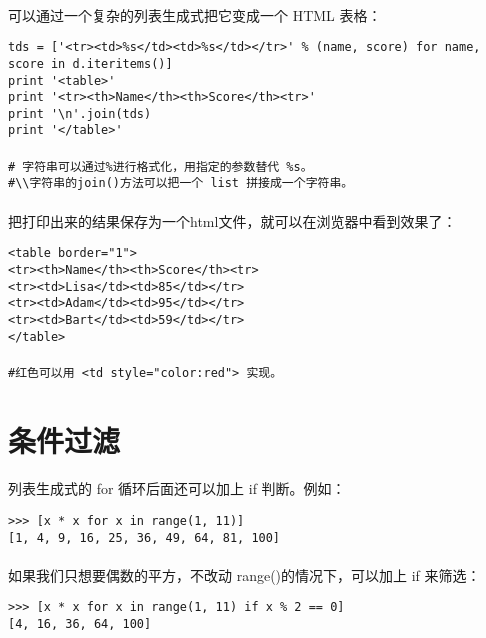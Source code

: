 \documentclass{article}
\begin{document}
\begin{CJK}{UTF8}{gbsn}
\paragraph{}
可以通过一个复杂的列表生成式把它变成一个 HTML 表格：
\begin{verbatim}
tds = ['<tr><td>%s</td><td>%s</td></tr>' % (name, score) for name, score in d.iteritems()]
print '<table>'
print '<tr><th>Name</th><th>Score</th><tr>'
print '\n'.join(tds)
print '</table>'
\end{verbatim}
\paragraph{}
\begin{verbatim}
# 字符串可以通过%进行格式化，用指定的参数替代 %s。
#\\字符串的join()方法可以把一个 list 拼接成一个字符串。
\end{verbatim}
\paragraph{}
把打印出来的结果保存为一个html文件，就可以在浏览器中看到效果了：
\begin{verbatim}
<table border="1">
<tr><th>Name</th><th>Score</th><tr>
<tr><td>Lisa</td><td>85</td></tr>
<tr><td>Adam</td><td>95</td></tr>
<tr><td>Bart</td><td>59</td></tr>
</table>
\end{verbatim}
\paragraph{}
\begin{verbatim}
#红色可以用 <td style="color:red"> 实现。
\end{verbatim}
\section{条件过滤}
\paragraph{}
列表生成式的 for 循环后面还可以加上 if 判断。例如：
\begin{verbatim}
>>> [x * x for x in range(1, 11)]
[1, 4, 9, 16, 25, 36, 49, 64, 81, 100]
\end{verbatim}
\paragraph{}
如果我们只想要偶数的平方，不改动 range()的情况下，可以加上 if 来筛选：
\begin{verbatim}
>>> [x * x for x in range(1, 11) if x % 2 == 0]
[4, 16, 36, 64, 100]
\end{verbatim}

\end{CJK}
\end{document}
